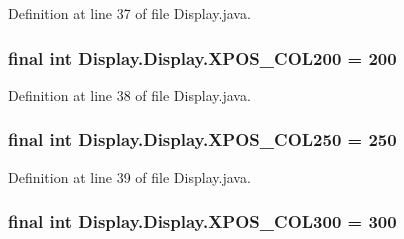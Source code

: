 Definition at line 37 of file Display.\+java.

\hypertarget{class_display_1_1_display_adbcb46204650409d834ab66950cdc370}{}
\subsubsection[{X\+P\+O\+S\+\_\+\+C\+O\+L200}]{\setlength{\rightskip}{0pt plus 5cm}final int Display.\+Display.\+X\+P\+O\+S\+\_\+\+C\+O\+L200 = 200\hspace{0.3cm}{\ttfamily [static]}}\label{class_display_1_1_display_adbcb46204650409d834ab66950cdc370}


Definition at line 38 of file Display.\+java.

\hypertarget{class_display_1_1_display_a9bc5732eb1a6077901a5e66984ffa339}{}
\subsubsection[{X\+P\+O\+S\+\_\+\+C\+O\+L250}]{\setlength{\rightskip}{0pt plus 5cm}final int Display.\+Display.\+X\+P\+O\+S\+\_\+\+C\+O\+L250 = 250\hspace{0.3cm}{\ttfamily [static]}}\label{class_display_1_1_display_a9bc5732eb1a6077901a5e66984ffa339}


Definition at line 39 of file Display.\+java.

\hypertarget{class_display_1_1_display_a37098506cf494cbf79cc2ca5e88cd3ac}{}
\subsubsection[{X\+P\+O\+S\+\_\+\+C\+O\+L300}]{\setlength{\rightskip}{0pt plus 5cm}final int Display.\+Display.\+X\+P\+O\+S\+\_\+\+C\+O\+L300 = 300\hspace{0.3cm}{\ttfamily [static]}}\label{class_display_1_1_display_a37098506cf494cbf79cc2ca5e88cd3ac}


